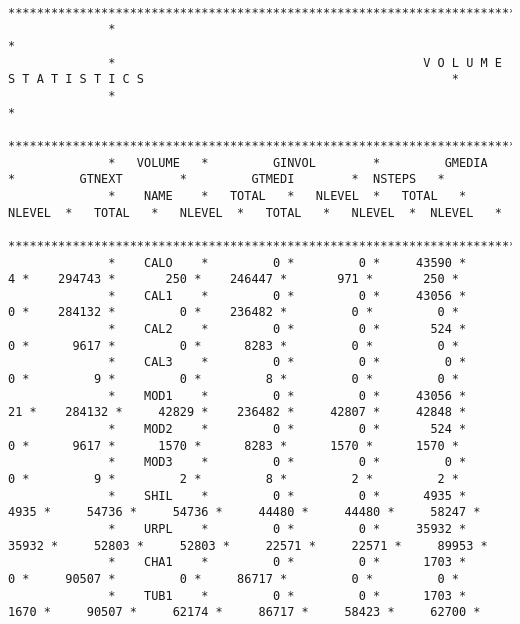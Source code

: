 \begin{center}
\tiny
\begin{verbatim}
              **************************************************************************************************************************
              *                                                                                                                        *
              *                                           V O L U M E    S T A T I S T I C S                                           *
              *                                                                                                                        *
              **************************************************************************************************************************
              *   VOLUME   *         GINVOL        *         GMEDIA        *         GTNEXT        *         GTMEDI        *  NSTEPS   *
              *    NAME    *   TOTAL   *   NLEVEL  *   TOTAL   *   NLEVEL  *   TOTAL   *   NLEVEL  *   TOTAL   *   NLEVEL  *  NLEVEL   *
              **************************************************************************************************************************
              *    CALO    *         0 *         0 *     43590 *         4 *    294743 *       250 *    246447 *       971 *       250 *
              *    CAL1    *         0 *         0 *     43056 *         0 *    284132 *         0 *    236482 *         0 *         0 *
              *    CAL2    *         0 *         0 *       524 *         0 *      9617 *         0 *      8283 *         0 *         0 *
              *    CAL3    *         0 *         0 *         0 *         0 *         9 *         0 *         8 *         0 *         0 *
              *    MOD1    *         0 *         0 *     43056 *        21 *    284132 *     42829 *    236482 *     42807 *     42848 *
              *    MOD2    *         0 *         0 *       524 *         0 *      9617 *      1570 *      8283 *      1570 *      1570 *
              *    MOD3    *         0 *         0 *         0 *         0 *         9 *         2 *         8 *         2 *         2 *
              *    SHIL    *         0 *         0 *      4935 *      4935 *     54736 *     54736 *     44480 *     44480 *     58247 *
              *    URPL    *         0 *         0 *     35932 *     35932 *     52803 *     52803 *     22571 *     22571 *     89953 *
              *    CHA1    *         0 *         0 *      1703 *         0 *     90507 *         0 *     86717 *         0 *         0 *
              *    TUB1    *         0 *         0 *      1703 *      1670 *     90507 *     62174 *     86717 *     58423 *     62700 *

\end{verbatim}
\end{center}
